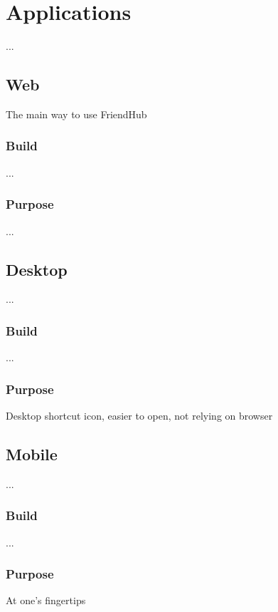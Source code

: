 \chapter{Applications}
    ...
    \section{Web}
    The main way to use FriendHub
    \subsection{Build}
    ...
    \subsection{Purpose}
    ...
    \section{Desktop}
    ...
    \subsection{Build}
    ...
    \subsection{Purpose}
    Desktop shortcut icon, easier to open, not relying on browser
    
    \section{Mobile}
    ...
    \subsection{Build}
    ...
    \subsection{Purpose}
    At one's fingertips
